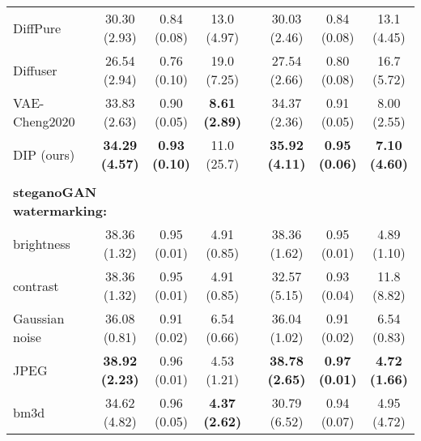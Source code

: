 \begin{table*}[!tb]
{\begin{tabular}{l c ccc c ccc}
\small{DiffPure} & & \small{30.30 \small{(2.93)}} & \small{0.84 \small{(0.08)}} & \small{13.0 \small{(4.97)}} & & \small{30.03 \small{(2.46)}} & \small{0.84 \small{(0.08)}} & \small{13.1 \small{(4.45)}}\\
\rowcolor{Gray}
\small{Diffuser} & & \small{26.54 \small{(2.94)}} & \small{0.76 \small{(0.10)}} & \small{19.0 \small{(7.25)}} & & \small{27.54 \small{(2.66)}} & \small{0.80 \small{(0.08)}} & \small{16.7 \small{(5.72)}}\\
\rowcolor{Gray}
\small{VAE-Cheng2020} & & \small{33.83 \small{(2.63)}} & \small{0.90 \small{(0.05)}} & \small{\textbf{8.61 \small{(2.89)}}} & & \small{34.37 \small{(2.36)}} & \small{0.91 \small{(0.05)}} & \small{8.00 \small{(2.55)}}\\
\hdashline
\rowcolor{Gray}
\small{DIP (ours)} & & \small{\textbf{34.29 \small{(4.57)}}} & \small{\textbf{0.93 \small{(0.10)}}} & \small{11.0 \small{(25.7)}} & & \small{\textbf{35.92 \small{(4.11)}}} & \small{\textbf{0.95 \small{(0.06)}}} & \small{\textbf{7.10 \small{(4.60)}}}\\
\toprule
\vspace{-0.9em}
\\
\multicolumn{3}{l}{\small{\textbf{steganoGAN watermarking: } }} & \multicolumn{6}{r}{}\\
\small{brightness} & & \small{38.36 \small{(1.32)}} & \small{0.95 \small{(0.01)}} & \small{4.91 \small{(0.85)}} & & \small{38.36 \small{(1.62)}} & \small{0.95 \small{(0.01)}} & \small{4.89 \small{(1.10)}}\\
\small{contrast} & & \small{38.36 \small{(1.32)}} & \small{0.95 \small{(0.01)}} & \small{4.91 \small{(0.85)}} & & \small{32.57 \small{(5.15)}} & \small{0.93 \small{(0.04)}} & \small{11.8 \small{(8.82)}}\\
\small{Gaussian noise} & & \small{36.08 \small{(0.81)}} & \small{0.91 \small{(0.02)}} & \small{6.54 \small{(0.66)}} & & \small{36.04 \small{(1.02)}} & \small{0.91 \small{(0.02)}} & \small{6.54 \small{(0.83)}}\\
\small{JPEG} & & \small{\textbf{38.92 \small{(2.23)}}} & \small{0.96 \small{(0.01)}} & \small{4.53 \small{(1.21)}} & & \small{\textbf{38.78 \small{(2.65)}}} & \small{\textbf{0.97 \small{(0.01)}}} & \small{\textbf{4.72 \small{(1.66)}}}\\
\rowcolor{Gray}
\small{bm3d} & & \small{34.62 \small{(4.82)}} & \small{0.96 \small{(0.05)}} & \small{\textbf{4.37 \small{(2.62)}}} & & \small{30.79 \small{(6.52)}} & \small{0.94 \small{(0.07)}} & \small{4.95 \small{(4.72)}}\\

\end{tabular}}
\end{table*}
